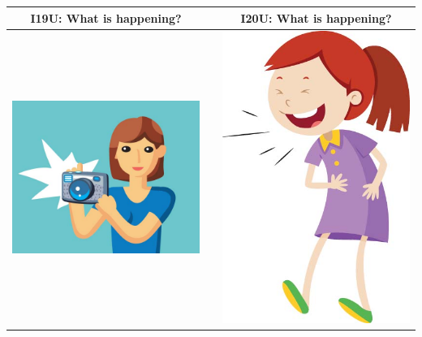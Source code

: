 \documentclass[12pt,notitlepage]{article}
\begin{document}
\begin{center}
\begin{tabular}{|c|c|c|}
\hline
I19U: What is happening? && I20U: What is happening? \\
\hline
\includegraphics[width=20em,trim=0 0 0 -3]{figures/I19.jpg} & & \includegraphics[width=20em,trim=0 0 0 -3]{figures/I20.jpg} \\
\hline
\end{tabular}
\vspace{1em} \\



\end{center}
\end{document}
